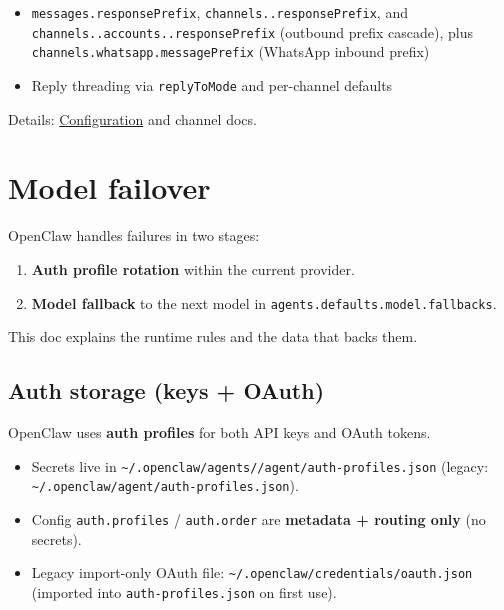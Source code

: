 \begin{itemize}
  \item \texttt{messages.responsePrefix}, \texttt{channels..responsePrefix}, and \texttt{channels..accounts..responsePrefix} (outbound prefix cascade), plus \texttt{channels.whatsapp.messagePrefix} (WhatsApp inbound prefix)
  \item Reply threading via \texttt{replyToMode} and per-channel defaults
\end{itemize}


Details: \href{/gateway/configuration\#messages}{Configuration} and channel docs.


\clearpage

\section{Model failover}


OpenClaw handles failures in two stages:

\begin{enumerate}
  \item \textbf{Auth profile rotation} within the current provider.
  \item \textbf{Model fallback} to the next model in \texttt{agents.defaults.model.fallbacks}.
\end{enumerate}


This doc explains the runtime rules and the data that backs them.

\subsection{Auth storage (keys + OAuth)}


OpenClaw uses \textbf{auth profiles} for both API keys and OAuth tokens.

\begin{itemize}
  \item Secrets live in \texttt{\textasciitilde{}/.openclaw/agents//agent/auth-profiles.json} (legacy: \texttt{\textasciitilde{}/.openclaw/agent/auth-profiles.json}).
  \item Config \texttt{auth.profiles} / \texttt{auth.order} are \textbf{metadata + routing only} (no secrets).
  \item Legacy import-only OAuth file: \texttt{\textasciitilde{}/.openclaw/credentials/oauth.json} (imported into \texttt{auth-profiles.json} on first use).
\end{itemize}


